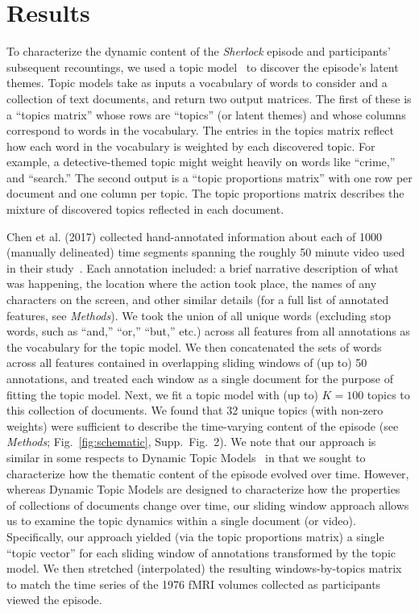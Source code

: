 \documentclass[10pt]{article}
\newcommand{\topics}{2}
\begin{document}
\section*{Results}
To characterize the dynamic content of the \textit{Sherlock} episode and participants' subsequent recountings, we used a topic model~\citep{BleiEtal03} to discover the episode's latent themes.  Topic models take as inputs a vocabulary of words to consider and a collection of text documents, and return two output matrices.  The first of these is a ``topics matrix'' whose rows are ``topics'' (or latent themes) and whose columns correspond to words in the vocabulary. The entries in the topics matrix reflect how each word in the vocabulary is weighted by each discovered topic.  For example, a detective-themed topic might weight heavily on words like ``crime,'' and ``search.''  The second output is a ``topic proportions matrix'' with one row per document and one column per topic.  The topic proportions matrix describes the mixture of discovered topics reflected in each document.

Chen et al. (2017) collected hand-annotated information about each of 1000 (manually delineated) time segments spanning the roughly 50 minute video used in their study~\cite{ChenEtal17}.  Each annotation included: a brief narrative description of what was happening, the location where the action took place, the names of any characters on the screen, and other similar details (for a full list of annotated features, see \textit{Methods}).  We took the union of all unique words (excluding stop words, such as ``and,'' ``or,'' ``but,'' etc.) across all features from all annotations as the vocabulary for the topic model.  We then concatenated the sets of words across all features contained in overlapping sliding windows of (up to) 50 annotations, and treated each window as a single document for the purpose of fitting the topic model.  Next, we fit a topic model with (up to) $K = 100$ topics to this collection of documents.  We found that 32 unique topics (with non-zero weights) were sufficient to describe the time-varying content of the episode (see \textit{Methods}; Fig.~\ref{fig:schematic}, Supp.\ Fig.~\topics).  We note that our approach is similar in some respects to Dynamic Topic Models~\citep{BleiLaff06} in that we sought to characterize how the thematic content of the episode evolved over time.  However, whereas Dynamic Topic Models are designed to characterize how the properties of collections of documents change over time, our sliding window approach allows us to examine the topic dynamics within a single document (or video).  Specifically, our approach yielded (via the topic proportions matrix) a single ``topic vector'' for each sliding window of annotations transformed by the topic model.  We then stretched (interpolated) the resulting windows-by-topics matrix to match the time series of the 1976 fMRI volumes collected as participants viewed the episode.
\end{document}
